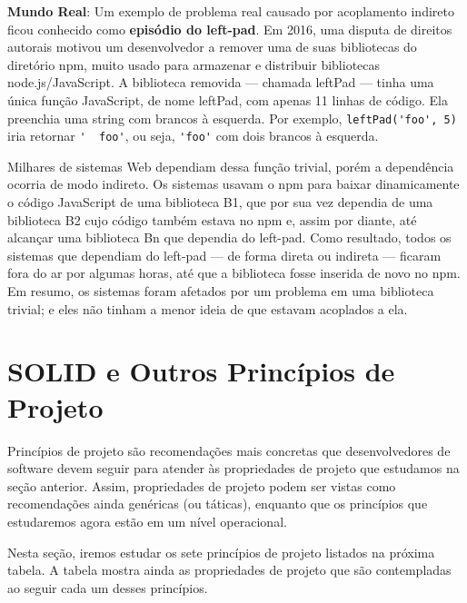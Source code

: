 \documentclass[
  11pt,
  twoside]{book}
\newcommand{\passthrough}[1]{#1}
\newenvironment{esmbox}{\centering \vspace{1.5ex} \begin{tcolorbox}[breakable, colback=backcolor, width=4.9in]}{\end{tcolorbox} \vspace{1.5ex}}
\begin{document}
\begin{esmbox} 

\textbf{Mundo Real}: Um exemplo de problema real causado por acoplamento
indireto ficou conhecido como \textbf{episódio do left-pad}. Em 2016,
uma disputa de direitos autorais motivou um desenvolvedor a remover uma
de suas bibliotecas do diretório npm, muito usado para armazenar e
distribuir bibliotecas node.js/JavaScript. A biblioteca removida ---
chamada leftPad --- tinha uma única função JavaScript, de nome leftPad,
com apenas 11 linhas de código. Ela preenchia uma string com brancos à
esquerda. Por exemplo, \passthrough{\lstinline!leftPad('foo', 5)!} iria
retornar \passthrough{\lstinline!'  foo'!}, ou seja,
\passthrough{\lstinline!'foo'!} com dois brancos à esquerda.

Milhares de sistemas Web dependiam dessa função trivial, porém a
dependência ocorria de modo indireto. Os sistemas usavam o npm para
baixar dinamicamente o código JavaScript de uma biblioteca B1, que por
sua vez dependia de uma biblioteca B2 cujo código também estava no npm
e, assim por diante, até alcançar uma biblioteca Bn que dependia do
left-pad. Como resultado, todos os sistemas que dependiam do left-pad
--- de forma direta ou indireta --- ficaram fora do ar por algumas
horas, até que a biblioteca fosse inserida de novo no npm. Em resumo, os
sistemas foram afetados por um problema em uma biblioteca trivial; e
eles não tinham a menor ideia de que estavam acoplados a ela.

\end{esmbox} 

\hypertarget{solid-e-outros-princuxedpios-de-projeto}{%
\section{SOLID e Outros Princípios de
Projeto}\label{solid-e-outros-princuxedpios-de-projeto}}


Princípios de projeto são recomendações mais concretas que
desenvolvedores de software devem seguir para atender às propriedades de
projeto que estudamos na seção anterior. Assim, propriedades de projeto
podem ser vistas como recomendações ainda genéricas (ou táticas),
enquanto que os princípios que estudaremos agora estão em um nível
operacional.

Nesta seção, iremos estudar os sete princípios de projeto listados na
próxima tabela. A tabela mostra ainda as propriedades de projeto que são
contempladas ao seguir cada um desses princípios.
\end{document}

